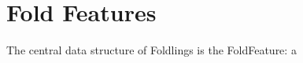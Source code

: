 \section{Fold Features}\label{fold-features}

The central data structure of Foldlings is the FoldFeature: a
